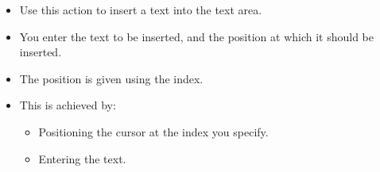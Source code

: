 \begin{itemize}
\item Use this action to insert a text into the text area.
\item You enter the text to be inserted, and the position at which it should be inserted.
\item The position is given using the index.
\item This is achieved by:
\begin{itemize}
\item Positioning the cursor at the index you specify.
\item Entering the text.
\end{itemize}
\end{itemize}
